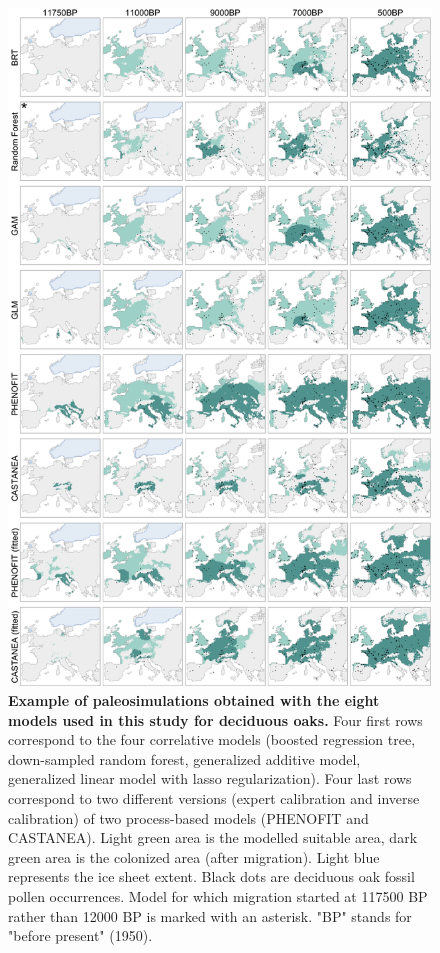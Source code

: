 \documentclass[pdflatex, sn-nature]{sn-jnl}%
\begin{document}
\begin{figure}
\centering
\vspace*{-0.6in}
\hspace*{-0.35in}
\includegraphics[scale=0.95]{quercus_deciduous_simulations.pdf}
\caption{\textbf{Example of paleosimulations obtained with the eight models used in this study for deciduous oaks.} Four first rows correspond to the four correlative models (boosted regression tree, down-sampled random forest, generalized additive model, generalized linear model with lasso regularization). Four last rows correspond to two different versions (expert calibration and inverse calibration) of two process-based models (PHENOFIT and CASTANEA). Light green area is the modelled suitable area, dark green area is the colonized area (after migration). Light blue represents the ice sheet extent. Black dots are deciduous oak fossil pollen occurrences. Model for which migration started at 117500 BP rather than 12000 BP is marked with an asterisk. "BP" stands for "before present" (1950).}\label{quercus_migration}
\end{figure}
\end{document}
